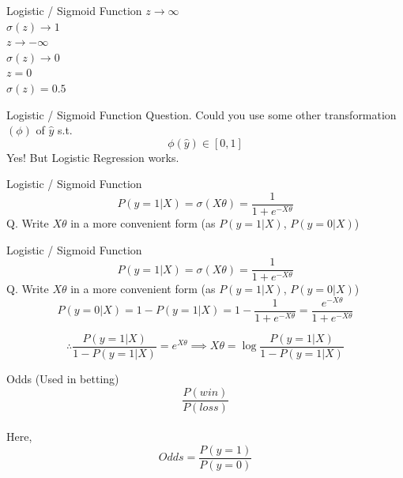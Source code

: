 \documentclass{beamer}
\begin{document}
\begin{frame}{Logistic / Sigmoid Function}
 $z \rightarrow \infty$\\
\pause  $\sigma(z) \rightarrow 1$\\
\pause $z \rightarrow -\infty$\\
 \pause $\sigma(z) \rightarrow 0$\\
 \pause $z = 0$\\
 \pause $\sigma(z) = 0.5$

\end{frame}

\begin{frame}{Logistic / Sigmoid Function}
Question. Could you use some other transformation $(\phi)$ of $\hat{y}$ s.t. \\
\begin{equation*}
\phi(\hat{y}) \in [0, 1]
\end{equation*}
Yes! But Logistic Regression works.
\end{frame}
\begin{frame}{Logistic / Sigmoid Function}
\begin{equation*}
P(y = 1 | X) = \sigma(X\theta) = \frac{1}{1 + e^{-X\theta}}    
\end{equation*}
Q. Write $X\theta$ in a more convenient form (as $P(y = 1|X)$, $P(y = 0 | X)$)\\
\end{frame}
\begin{frame}{Logistic / Sigmoid Function}
\begin{equation*}
P(y = 1 | X) = \sigma(X\theta) = \frac{1}{1 + e^{-X\theta}}    
\end{equation*}
Q. Write $X\theta$ in a more convenient form (as $P(y = 1|X)$, $P(y = 0 | X)$)\\
\pause \begin{equation*}
P(y = 0 | X) = 1 - P(y = 1 | X) = 1 - \frac{1}{1 + e^{-X\theta}} = \frac{e^{-X\theta}}{1 + e^{-X\theta}} 
\end{equation*}

\pause \begin{equation*}
\therefore \frac{P(y = 1|X)}{1 - P(y = 1|X)} = e^{X\theta}
\implies X\theta = \log\frac{P(y = 1|X)}{1 - P(y = 1 | X)}
\end{equation*}
\end{frame}
\begin{frame}{Odds (Used in betting)}
$$\frac{P(win)}{P(loss)}$$ \\
\hspace{3cm} Here,\\
$$Odds = \frac{P(y = 1)}{P(y = 0)}$$ \\
\centering
{}
\end{frame}
\end{document}

